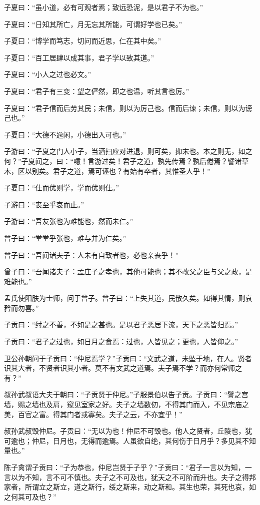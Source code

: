 \documentclass[twoside,openany]{book}
\begin{document}
子夏曰：“虽小道，必有可观者焉；致远恐泥，是以君子不为也。”

子夏曰：“日知其所亡，月无忘其所能，可谓好学也已矣。”

子夏曰：“博学而笃志，切问而近思，仁在其中矣。”

子夏曰：“百工居肆以成其事，君子学以致其道。”

子夏曰：“小人之过也必文。”

子夏曰：“君子有三变：望之俨然，即之也温，听其言也厉。”

子夏曰：“君子信而后劳其民；未信，则以为厉己也。信而后谏；未信，则以为谤己也。”

子夏曰：“大德不逾闲，小德出入可也。”

子游曰：“子夏之门人小子，当洒扫应对进退，则可矣，抑末也。本之则无，如之何？”子夏闻之，曰：“噫！言游过矣！君子之道，孰先传焉？孰后倦焉？譬诸草木，区以别矣。君子之道，焉可诬也？有始有卒者，其惟圣人乎！”

子夏曰：“仕而优则学，学而优则仕。”

子游曰：“丧至乎哀而止。”

子游曰：“吾友张也为难能也，然而未仁。”

曾子曰：“堂堂乎张也，难与并为仁矣。”

曾子曰：“吾闻诸夫子：人未有自致者也，必也亲丧乎！”

曾子曰：“吾闻诸夫子：孟庄子之孝也，其他可能也；其不改父之臣与父之政，是难能也。”

孟氏使阳肤为士师，问于曾子。曾子曰：“上失其道，民散久矣。如得其情，则哀矜而勿喜。”

子贡曰：“纣之不善，不如是之甚也。是以君子恶居下流，天下之恶皆归焉。”

子贡曰：“君子之过也，如日月之食焉：过也，人皆见之；更也，人皆仰之。”

卫公孙朝问于子贡曰：“仲尼焉学？”子贡曰：“文武之道，未坠于地，在人。贤者识其大者，不贤者识其小者。莫不有文武之道焉。夫子焉不学？而亦何常师之有？”

叔孙武叔语大夫于朝曰：“子贡贤于仲尼。”子服景伯以告子贡。子贡曰：“譬之宫墙，赐之墙也及肩，窥见室家之好。夫子之墙数仞，不得其门而入，不见宗庙之美，百官之富。得其门者或寡矣。夫子之云，不亦宜乎！”

叔孙武叔毁仲尼。子贡曰：“无以为也！仲尼不可毁也。他人之贤者，丘陵也，犹可逾也；仲尼，日月也，无得而逾焉。人虽欲自绝，其何伤于日月乎？多见其不知量也。”

陈子禽谓子贡曰：“子为恭也，仲尼岂贤于子乎？”子贡曰：“君子一言以为知，一言以为不知，言不可不慎也。夫子之不可及也，犹天之不可阶而升也。夫子之得邦家者，所谓立之斯立，道之斯行，绥之斯来，动之斯和。其生也荣，其死也哀，如之何其可及也？”
\end{document}
